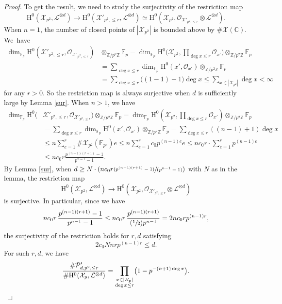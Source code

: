 \documentclass[JEP,XML,SOM,Unicode,published]{cedram}
\newcommand{\Psfrac}[2]{(\sfrac{#1}{#2})}
\newcommand{\pspfrac}[2]{\sfrac{(#1)}{(#2)}}
\theoremstyle{plain}
\theoremstyle{definition}
\newcommand{\ho}{\mathrm{H}}
\newcommand{\Oc}{\mathcal{O}}
\newcommand{\X}{\mathcal{X}}
\newcommand{\li}{\mathcal{L}}
\newcommand{\Z}{\mathbb{Z}}
\newcommand{\bbC}{\mathbb{C}}
\newcommand{\F}{\mathbb{F}}
\begin{document}
\begin{proof}
To get the result, we need to study the surjectivity of the restriction map\vspace*{-3pt}
\[
\ho^0(\X_{p^2}, \li^{\otimes d})\to \ho^0(\X'_{p^2,\leq r}, \li^{\otimes d})\simeq\ho^0(\X_{p^2}, \mathcal{O}_{\X'_{p^2,\leq r}}\otimes \li^{\otimes d}).
\]
When $n=1$, the number of closed points of $|\X_{p^2}|$ is bounded above by $\#\X(\bbC)$. We~have\vspace*{-3pt}
\begin{align*}
\dim_{\F_p}\ho^0(\X'_{p^2,\leq r}, \Oc_{\X'_{p^2,\leq r}})&\otimes_{\Z/p^2\Z} \F_p =\dim_{\F_p}\ho^0\bigl(\X_{p^2}, \textstyle\prod_{\deg x\leq r}\Oc_{x'}\bigr)\otimes_{\Z/p^2\Z} \F_p\\
&= \sum_{\deg x\leq r}\dim_{\F_p}\ho^0(x', \Oc_{x'})\otimes_{\Z/p^2\Z} \F_p\\
&= \sum_{\deg x\leq r} {\big((1-1)+1\big)\deg x}\leq \sum_{x\in |\X_{p^2}|}\deg x<\infty
\end{align*}
for any $r>0$. So the restriction map is always surjective when $d$ is sufficiently large by Lemma \ref{sur}.
When $n>1$, we have\vspace*{-3pt}
\begin{align*}
\dim_{\F_p}\ho^0(&\X'_{p^2,\leq r}, \Oc_{\X'_{p^2,\leq r}})\otimes_{\Z/p^2\Z} \F_p =\dim_{\F_p}\ho^0(\X_{p^2}, \textstyle\prod_{\deg x\leq r}\Oc_{x'})\otimes_{\Z/p^2\Z} \F_p\\
&= \sum_{\deg x\leq r}\dim_{\F_p}\ho^0(x', \Oc_{x'})\otimes_{\Z/p^2\Z} \F_p= \sum_{\deg x\leq r} {((n-1)+1)\deg x}\\
&\leq n \sum_{e=1}^r \#\X_{p^2}(\F_{p^e})e\leq n \sum_{e=1}^r c_0p^{(n-1)e}e\leq n c_0r\cdot \sum_{e=1}^r p^{(n-1)e}\\
&\leq n c_0r \frac{p^{(n-1)(r+1)}-1}{p^{n-1}-1}.
\end{align*}
By Lemma \ref{sur}, when $d\geq N\cdot(n c_0r\pspfrac{p^{(n-1)(r+1)}-1}{p^{n-1}-1})$ with $N$ as in the lemma, the restriction map\vspace*{-3pt}
\[
\ho^0(\X_{p^2}, \li^{\otimes d})\to \ho^0(\X_{p^2}, \mathcal{O}_{\X'_{p^2,\leq r}}\otimes \li^{\otimes d})
\]
is surjective. In particular, since we have%
\[
n c_0r\, \frac{p^{(n-1)(r+1)}-1}{p^{n-1}-1}\leq nc_0r\,\frac{p^{(n-1)(r+1)}}{\Psfrac{1}{2}p^{n-1}}=2nc_0rp^{(n-1)r},
\]
the surjectivity of the restriction holds for $r,d$ satisfying\vspace*{-3pt}
\[
2c_0Nnrp^{(n-1)r}\leq d.
\]
For such $r,d$, we have\vspace*{-3pt}
\[
\frac{\#\mathcal{P}'_{d,p^2,\leq r}}{\#\ho^0(\X_{p}, \li^{\otimes d})}=\prod_{\substack{x\in |\X_{p}|\\ \deg x\leq r}} \bigl(1-p^{-(n+1)\deg x} \bigr).\qedhere
\]
\end{proof}
\end{document}

